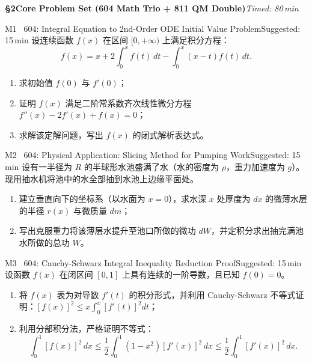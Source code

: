 \documentclass[a4paper,11pt]{article}
\begin{document}
\clearpage

{\Large\sffamily\bfseries\color{navy} \S 2\quad Core Problem Set (604 Math Trio + 811 QM Double)}\hfill{\small\sffamily\color{mist}\itshape Timed: 80\,min}

\vspace{5pt}

\begin{problem}{M1 \textbar\ 604: Integral Equation to 2nd-Order ODE Initial Value Problem}{Suggested: 15\,min}
设连续函数 $f(x)$ 在区间 $[0, +\infty)$ 上满足积分方程：
\[
  f(x) = x + 2 \int_0^x f(t)\,dt - \int_0^x (x-t) f(t)\,dt.
\]
\begin{enumerate}[leftmargin=1.5em,itemsep=1pt,topsep=1pt]
  \item 求初始值 $f(0)$ 与 $f'(0)$；
  \item 证明 $f(x)$ 满足二阶常系数齐次线性微分方程 $f''(x) - 2f'(x) + f(x) = 0$；
  \item 求解该定解问题，写出 $f(x)$ 的闭式解析表达式。
\end{enumerate}
\end{problem}

\vspace{3pt}

\begin{problem}{M2 \textbar\ 604: Physical Application: Slicing Method for Pumping Work}{Suggested: 15\,min}
设有一半径为 $R$ 的半球形水池盛满了水（水的密度为 $\rho$，重力加速度为 $g$）。现用抽水机将池中的水全部抽到水池上边缘平面处。
\begin{enumerate}[leftmargin=1.5em,itemsep=1pt,topsep=1pt]
  \item 建立垂直向下的坐标系（以水面为 $x=0$），求水深 $x$ 处厚度为 $dx$ 的微薄水层的半径 $r(x)$ 与微质量 $dm$；
  \item 写出克服重力将该薄层水提升至池口所做的微功 $dW$，并定积分求出抽完满池水所做的总功 $W$。
\end{enumerate}
\end{problem}

\vspace{3pt}

\begin{problem}{M3 \textbar\ 604: Cauchy-Schwarz Integral Inequality Reduction Proof}{Suggested: 15\,min}
设函数 $f(x)$ 在闭区间 $[0, 1]$ 上具有连续的一阶导数，且已知 $f(0) = 0$。
\begin{enumerate}[leftmargin=1.5em,itemsep=1pt,topsep=1pt]
  \item 将 $f(x)$ 表为对导数 $f'(t)$ 的积分形式，并利用 Cauchy-Schwarz 不等式证明：$[f(x)]^2 \le x \int_0^x [f'(t)]^2 dt$；
  \item 利用分部积分法，严格证明不等式：
  \[
    \int_0^1 [f(x)]^2\,dx \le \frac{1}{2} \int_0^1 (1-x^2)[f'(x)]^2\,dx \le \frac{1}{2} \int_0^1 [f'(x)]^2\,dx.
  \]
\end{enumerate}
\end{problem}
\end{document}
